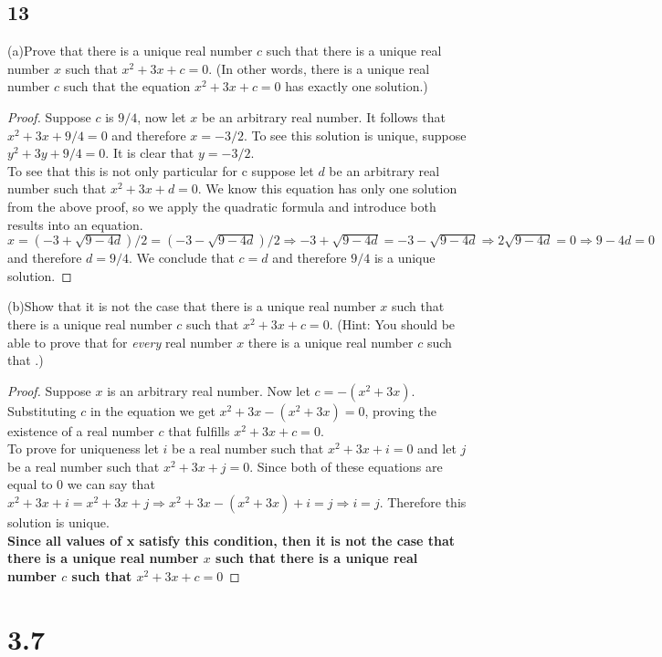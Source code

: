 \documentclass{article}
\begin{document}
\subsection{13}
(a)Prove that there is a unique real number $c$ such that there is a unique real number $x$ such that $x^2 + 3x + c =0$. (In other words, there is a unique real number $c$ such that the equation $x^2 + 3x + c = 0$ has exactly one solution.)
\begin{proof}
Suppose $c$ is $9 / 4$, now let $x$ be an arbitrary real number. It follows that $x^2 + 3x + 9/4 = 0$ and therefore $x= -3/2$. To see this solution is unique, suppose $y^2 + 3y + 9/4 = 0$. It is clear that $y= -3/2$. $ $\\
To see that this is not only particular for c suppose let $d$ be an arbitrary real number such that $x^2 + 3x + d = 0$. We know this equation has only one solution from the above proof, so we apply the quadratic formula and introduce both results into an equation. $x= (-3+\sqrt{9-4d})/2=(-3-\sqrt{9-4d})/2 \Rightarrow -3+ \sqrt{9-4d}= -3-\sqrt{9-4d} \Rightarrow 2\sqrt{9-4d}=0 \Rightarrow 9-4d=0$ and therefore $d=9/4$. We conclude that $c=d$ and therefore $9/4$ is a unique solution.
\end{proof}$ $\\
(b)Show that it is not the case that there is a unique real number $x$ such that there is a unique real number $c$ such that $x^2 + 3x + c = 0$. (Hint: You should be able to prove that for \textit{every} real number $x$ there is a unique real number $c$ such that .)
\begin{proof}
Suppose $x$ is an arbitrary real number. Now let $c=-(x^2+3x)$. Substituting $c$ in the equation we get $x^2 + 3x -(x^2 + 3x) =0$, proving the existence of a real number $c$ that fulfills $x^2 + 3x + c = 0$. $ $\\ To prove for uniqueness let $i$ be a real number such that $x^2 +3x +i = 0$ and let $j$ be a real number such that $x^2 +3x +j = 0$. Since both of these equations are equal to 0 we can say that $x^2 +3x +i = x^2 +3x +j \Rightarrow x^2 +3x - (x^2 +3x)+i=j \Rightarrow i=j $. Therefore  this solution is unique. $ $\\ 
\textbf{Since all values of x satisfy this condition, then it is not the case that there is a unique real number $x$ such that there is a unique real number $c$ such that $x^2 + 3x + c = 0$}
\end{proof}
\newpage
\section{3.7}
\end{document}
